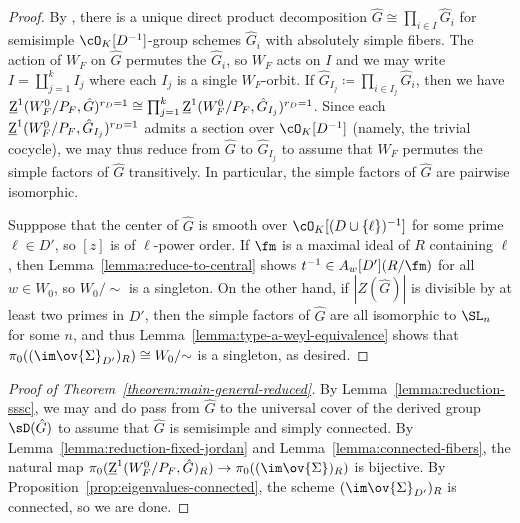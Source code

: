 \begin{proof}
    By \cite[XXIV, 5.3, 5.5]{SGA3III}, there is a unique direct product decomposition $\hat{G} \cong \prod_{i \in I} \hat{G}_i$ for semisimple $\cO_K[D^{-1}]$-group schemes $\hat{G}_i$ with absolutely simple fibers. The action of $W_F$ on $\hat{G}$ permutes the $\hat{G}_i$, so $W_F$ acts on $I$ and we may write $I = \coprod_{j=1}^k I_j$ where each $I_j$ is a single $W_F$-orbit. If $\hat{G}_{I_j} \coloneqq \prod_{i \in I_j} \hat{G}_i$, then we have $\underline{\rm{Z}}^1(W_F^0/P_F, \hat{G})^{r_D = 1} \cong \prod_{j=1}^k \underline{\rm{Z}}^1(W_F^0/P_F, \hat{G}_{I_j})^{r_D = 1}$. Since each $\underline{\rm{Z}}^1(W_F^0/P_F, \hat{G}_{I_j})^{r_D = 1}$ admits a section over $\cO_K[D^{-1}]$ (namely, the trivial cocycle), we may thus reduce from $\hat{G}$ to $\hat{G}_{I_j}$ to assume that $W_F$ permutes the simple factors of $\hat{G}$ transitively. In particular, the simple factors of $\hat{G}$ are pairwise isomorphic.\smallskip
    
    Supppose that the center of $\hat{G}$ is smooth over $\cO_K[(D \cup \{\ell\})^{-1}]$ for some prime $\ell \in D'$, so $[z]$ is of $\ell$-power order. If $\fm$ is a maximal ideal of $R$ containing $\ell$, then Lemma~\ref{lemma:reduce-to-central} shows $t^{-1} \in A_w[D'](R/\fm)$ for all $w \in W_0$, so $W_0/{\sim}$ is a singleton. On the other hand, if $|Z(\hat{G})|$ is divisible by at least two primes in $D'$, then the simple factors of $\hat{G}$ are all isomorphic to $\SL_n$ for some $n$, and thus Lemma~\ref{lemma:type-a-weyl-equivalence} shows that $\pi_0((\im \ov{\Sigma}_{D'})_R) \cong W_0/{\sim}$ is a singleton, as desired.
\end{proof}

\begin{proof}[Proof of Theorem~\ref{theorem:main-general-reduced}]
    By Lemma~\ref{lemma:reduction-sssc}, we may and do pass from $\hat{G}$ to the universal cover of the derived group $\sD(\hat{G})$ to assume that $\hat{G}$ is semisimple and simply connected. By Lemma~\ref{lemma:reduction-fixed-jordan} and Lemma~\ref{lemma:connected-fibers}, the natural map $\pi_0(\underline{\rm{Z}}^1(W_F^0/P_F, \hat{G})_R) \to \pi_0((\im \ov{\Sigma})_R)$ is bijective. By Proposition~\ref{prop:eigenvalues-connected}, the scheme $(\im \ov{\Sigma}_{D'})_R$ is connected, so we are done.
\end{proof}

